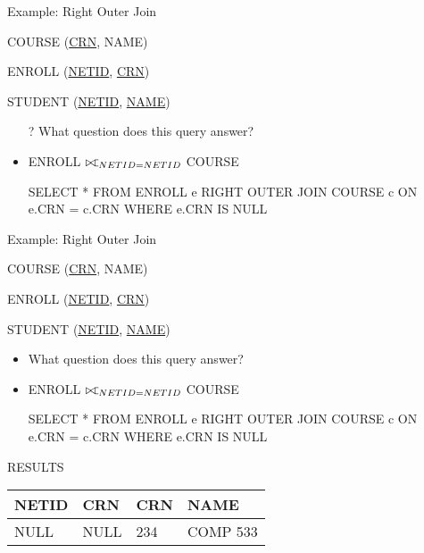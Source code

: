\documentclass[aspectratio=169]{beamer}
\def\ojoin{\setbox0=\hbox{$\bowtie$}%
  \rule[-.02ex]{.25em}{.4pt}\llap{\rule[\ht0]{.25em}{.4pt}}}
\def\rightouterjoin{\mathbin{\bowtie\mkern-5.8mu\ojoin}}
\begin{document}
\begin{frame}[fragile]{Example: Right Outer Join}

COURSE (\underline{CRN}, NAME)

ENROLL (\underline{NETID}, \underline{CRN})

STUDENT (\underline{NETID}, \underline{NAME})


\begin{itemize}
\item[?] What question does this query answer?
\item ENROLL $\rightouterjoin_{NETID = NETID}$ COURSE

\begin{SQL}
SELECT *
FROM ENROLL e RIGHT OUTER JOIN COURSE c ON e.CRN = c.CRN
WHERE e.CRN IS NULL
\end{SQL}
\end{itemize}


\end{frame}
\begin{frame}[fragile]{Example: Right Outer Join}

COURSE (\underline{CRN}, NAME)

ENROLL (\underline{NETID}, \underline{CRN})

STUDENT (\underline{NETID}, \underline{NAME})

\begin{itemize}
\item What question does this query answer?
\item ENROLL $\rightouterjoin_{NETID = NETID}$ COURSE
\begin{SQL}
SELECT *
FROM ENROLL e RIGHT OUTER JOIN COURSE c ON e.CRN = c.CRN
WHERE e.CRN IS NULL
\end{SQL}
\end{itemize}

RESULTS\\
\begin{tabular}{|l|l|l|l|} \hline
\textbf{NETID} & \textbf{CRN} & \textbf{CRN} & \textbf{NAME}\\ \hline
NULL & NULL  & 234 & COMP 533\\\hline
\end{tabular}\\


\end{frame}
\end{document}
